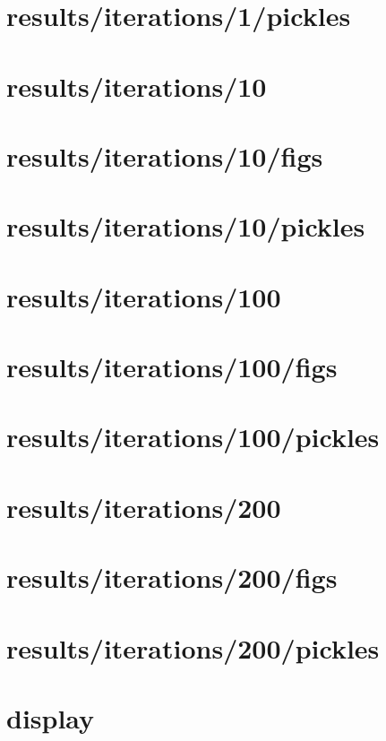\section{results/iterations/1/pickles}
\section{results/iterations/10}
\section{results/iterations/10/figs}
\section{results/iterations/10/pickles}
\section{results/iterations/100}
\section{results/iterations/100/figs}
\section{results/iterations/100/pickles}
\section{results/iterations/200}
\section{results/iterations/200/figs}
\section{results/iterations/200/pickles}
\section{display}
